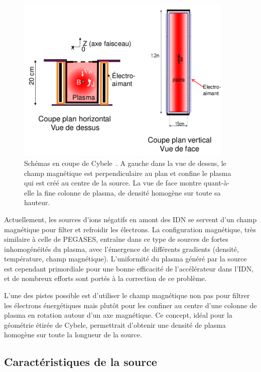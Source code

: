\begin{refsection}
\begin{figure}[!h]
  \centering
    \includegraphics[height=8cm]{figures/4-cybeleSchema.png}
    \caption{Schémas en coupe de Cybele~\parencite{SimoninHDR}. A gauche dans la
vue de dessus, le champ magnétique est perpendiculaire au plan et confine le
plasma qui est créé au centre de la source. La vue de face montre quant-à-elle
la fine colonne de plasma, de densité homogène sur toute sa hauteur.
\label{4-cybeleSchema}}
\end{figure}	

Actuellement, les sources d'ions négatifs en amont des IDN se servent d'un champ
magnétique pour filter et refroidir les électrons. La configuration magnétique,
très similaire à celle de PEGASES, entraîne dans ce type de sources de fortes
inhomogénéités du plasma, avec l'émergence de différents gradients
(densité, température, champ magnétique). L'uniformité du plasma généré par
la source est cependant primordiale pour une bonne efficacité de l'accélérateur
dans l'IDN, et de nombreux efforts sont portés à la correction de ce problème.

L'une des pistes possible est d'utiliser le champ magnétique non pas pour
filtrer les électrons énergétiques mais plutôt pour les confiner au centre
d'une colonne de plasma en rotation autour d'un axe magnétique. Ce concept,
idéal pour la géométrie étirée de Cybele, permettrait d'obtenir une densité de
plasma homogène sur toute la longueur de la source. 

\subsection{Caractéristiques de la source}


\end{refsection}
